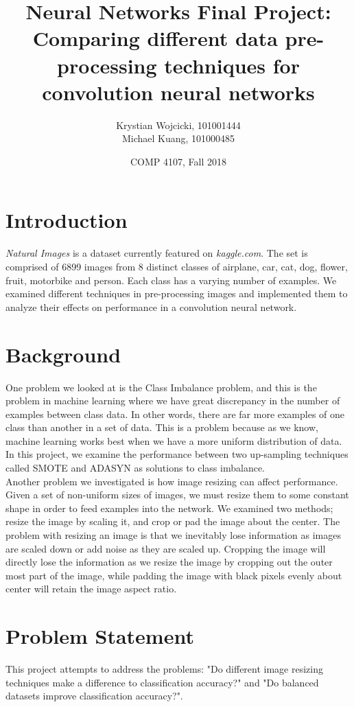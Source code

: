 \documentclass{article}
\title{Neural Networks Final Project: \\
	\large{Comparing different data pre-processing techniques for convolution neural networks}}
\author{Krystian Wojcicki, 101001444 \\ Michael Kuang, 101000485}
\date{COMP 4107, Fall 2018}
\begin{document}
\maketitle

\newpage

\section{Introduction}

{\em Natural Images} is a dataset currently featured on {\em kaggle.com}. The set is comprised of 6899 images from 8 distinct classes of airplane, car, cat, dog, flower, fruit, motorbike and person. Each class has a varying number of examples. We examined different techniques in pre-processing images and implemented them to analyze their effects on performance in a convolution neural network. 
\section{Background}

One problem we looked at is the Class Imbalance problem, and this is the problem in machine learning where we have great discrepancy in the number of examples between class data. In other words, there are far more examples of one class than another in a set of data. This is a problem because as we know, machine learning works best when we have a more uniform distribution of data. In this project, we examine the performance between two up-sampling techniques called SMOTE and ADASYN as solutions to class imbalance. \\

Another problem we investigated is how image resizing can affect performance. Given a set of non-uniform sizes of images, we must resize them to some constant shape in order to feed examples into the network. We examined two methods; resize the image by scaling it, and crop or pad the image about the center. The problem with resizing an image is that we inevitably lose information as images are scaled down or add noise as they are scaled up. Cropping the image will directly lose the information as we resize the image by cropping out the outer most part of the image, while padding the image with black pixels evenly about center will retain the image aspect ratio.

\section{Problem Statement}
This project attempts to address the problems: "Do different image resizing techniques make a difference to classification accuracy?" and "Do balanced datasets improve classification accuracy?".
\end{document}
